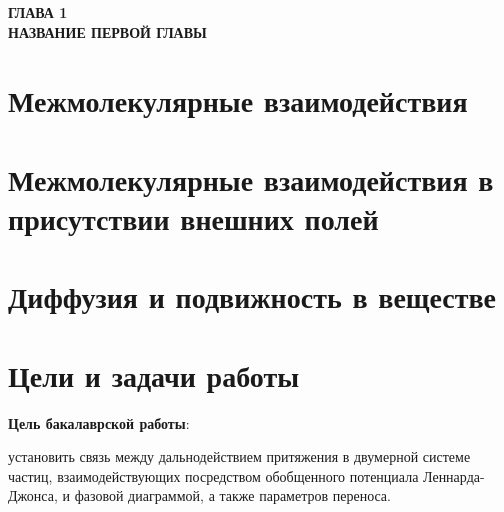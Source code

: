 
\newpage
\begin{center}
\textbf{ГЛАВА 1}\\
\textbf{НАЗВАНИЕ ПЕРВОЙ ГЛАВЫ}
\end{center}




\section{Межмолекулярные взаимодействия}\label{C1_1}



\section{Межмолекулярные взаимодействия в присутствии внешних полей}\label{C1_2}

\section{Диффузия и подвижность в веществе}\label{C1_3}


\section{Цели и задачи работы}

\textbf{Цель бакалаврской работы}: 

установить связь между дальнодействием притяжения в двумерной системе частиц, взаимодействующих посредством обобщенного потенциала Леннарда-Джонса, и фазовой диаграммой, а также параметров переноса.
